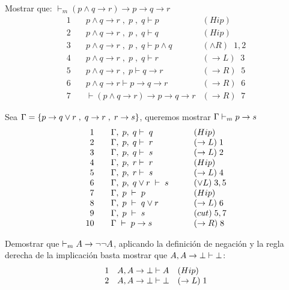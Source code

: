 \documentclass[11pt,letterpaper]{article}
\begin{document}
\bi
\item Mostrar que: \hspace{0.5cm} $\vdash_m (p \land q \to r) 
\to p \to q \to r$ 
\[
\begin{array}{rll}
1\quad & p \land q \to r \; , \; p \; , \; q \vdash p & 
(Hip) \\
2\quad & p \land q \to r \; , \; p \; , \; q \vdash q & 
(Hip)\\
3\quad & p \land q \to r \; , \; p \; , \; q \vdash p \land q & 
( \land R) \;\; 1,2\\
4\quad & p \land q \to r \; , \; p \; , \; q \vdash  r 
& (\to L) \;\; 3\\
5\quad & p \land q \to r \; , \; p  \vdash q \to r 
& (\to R) \;\; 5 \\
6\quad & p \land q \to r  \vdash p \to q \to r &
(\to R) \;\; 6\\
7\quad &  \vdash (p \land q \to r) \to p \to q 
\to r &(\to R) \;\; 7
\end{array}
\]

\item Sea $\G=\{p \to q \lor r \; , \; q\to r \; , \; r\to s\}$, queremos 
mostrar $\G\vdash_m p\to s$ 
\[
\begin{array}{rll}
1 \quad & \G,\;p,\;q \vdash \; q & \qquad (Hip) \\
2 \quad & \G,\;p,\;q\vdash\; r & \qquad (\to L) \; 1 \\
3 \quad & \G,\;p,\;q\vdash\; s & \qquad ( \to L) \; 2 \\
4 \quad & \G,\;p,\;r \vdash\; r & \qquad (Hip)    \\
5 \quad & \G,\;p,\;r \vdash \; s & \qquad (\to L) \; 4 \\
6 \quad & \G,\;p,\; q\lor r \; \vdash \; s & \qquad  (\lor L) \;3,5\\
7 \quad & \G,\;p\; \vdash \; p & \qquad  (Hip)  \\
8 \quad & \G,\;p\; \vdash \; q\lor r & \qquad  (\to L) \; 6 \\
9 \quad & \G,\;p \;\vdash \; s & \qquad  (cut)\; 5,7 \\
10\quad & \G\;\vdash \; p\to s &\qquad (\to R) \; 8
\end{array}
\]



\item Demostrar que $\vdash_m A\imp \neg\neg A$, aplicando la definición de 
negación y la regla derecha de la implicaci\'on basta mostrar que  
$A,A\imp\bot\vdash\bot$:
\[
\ba{rll}
1 & A, A\imp\bot\vdash A & (Hip)\\
2 & A, A\imp\bot\vdash \bot & (\imp L) \; 1\\
\ea
\]
\end{document}
